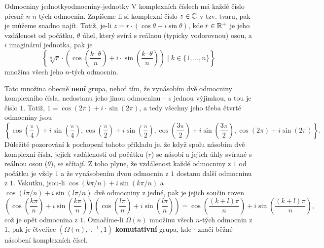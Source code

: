 \begin{example}{Odmocniny jednotky}{odmocniny-jednotky}
 V komplexních číslech má každé číslo přesně $n$ $n$-tých odmocnin. Zapíšeme-li
 si komplexní číslo $z \in \mathbb{C}$ v tzv.  tvaru, pak je můžeme
 snadno najít. Totiž, je-li $z = r \cdot (\cos\theta + i \sin\theta)$, kde $r
 \in \mathbb{R}^{+}$ je jeho vzdálenost od počátku, $\theta$ úhel, který svírá s reálnou
 (typicky vodorovnou) osou, a $i$ imaginární jednotka, pak je
 \[
  \left\{\sqrt[n]{r} \cdot \left(\cos\left(\frac{k \cdot \theta}{n}\right) + i
  \cdot \sin\left(\frac{k \cdot \theta}{n}\right)\right) \mid k \in
  \{1,\ldots,n\} \right\}
 \]
 množina všech jeho $n$-tých odmocnin.

 Tato množina obecně \textbf{není} grupa, neboť tím, že vynásobím dvě odmocniny
 komplexního čísla, nedostanu jeho jinou odmocninu -- s jednou výjimkou, a tou
 je číslo $1$. Totiž, $1 = \cos(2\pi) + i \cdot \sin(2\pi)$, a tedy všechny jeho
 třeba čtvrté odmocniny jsou
 \[
  \left\{ \cos\left(\frac{\pi}{4}\right)+i \sin \left( \frac{\pi}{4}
  \right), \cos \left( \frac{\pi}{2} \right) + i \sin \left( \frac{\pi}{2}
  \right), \cos\left(\frac{3\pi}{2}\right)+i\sin \left( \frac{3\pi}{2}
  \right), \cos \left( 2\pi \right) + i\sin \left( 2\pi \right) \right\}.
 \]
 Důležité pozorování k pochopení tohoto příkladu je, že když spolu násobím dvě
 komplexní čísla, jejich vzdálenosti od počátku ($r$) se násobí a jejich úhly
 svírané s reálnou osou ($\theta$), se sčítají. Z toho plyne, že vzdálenost
 každé odmocniny z $1$ od počátku je vždy $1$ a že vynásobením dvou odmocnin z
 $1$ dostanu další odmocninu z $1$. Vskutku, jsou-li $\cos (k\pi / n) +
 i\sin(k\pi / n)$ a $\cos(l\pi / n) + i\sin(l\pi / n)$ dvě odmocniny z jedné,
 pak je jejich součin roven
 \[
  \left( \cos \left( \frac{k\pi}{n} \right) + i\sin \left( \frac{k\pi}{n}
   \right) \right) \left( \cos \left( \frac{l\pi}{n} \right) + i\sin \left(
   \frac{l\pi}{n} \right)\right) = \cos \left( \frac{(k+l)\pi}{n} \right) +
   i\sin \left( \frac{(k+l)\pi}{n} \right),
 \]
 což je opět odmocnina z $1$. Označíme-li $\Omega(n)$ množinu všech $n$-tých
 odmocnin z $1$, pak je čtveřice $(\Omega(n), \cdot ,^{-1},1)$
 \textbf{komutativní} grupa, kde $ \cdot $ značí běžné násobení komplexních
 čísel.
 \begin{figure}[H]
  \centering
  \begin{subfigure}[t]{.3\textwidth}
   \centering
\end{subfigure}
\end{figure}
\end{example}
